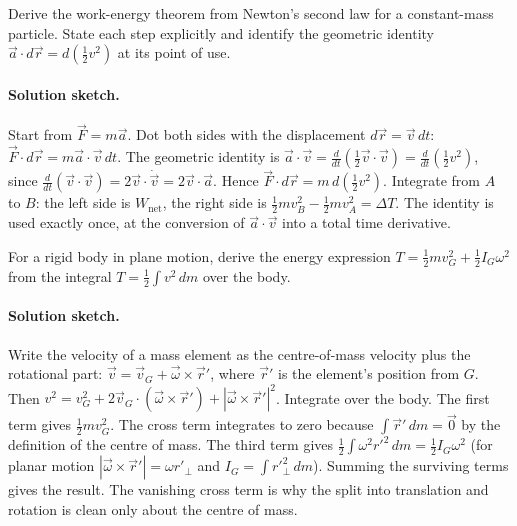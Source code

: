 \begin{exercise}
Derive the work-energy theorem from Newton's second law for a
constant-mass particle. State each step explicitly and identify the
geometric identity $\vec{a}\cdot d\vec{r} = d(\tfrac{1}{2} v^2)$ at
its point of use.
\paragraph{Solution sketch.} Start from $\vec{F}=m\vec{a}$. Dot both
sides with the displacement $d\vec{r}=\vec{v}\,dt$:
$\vec{F}\cdot d\vec{r}=m\vec{a}\cdot\vec{v}\,dt$. The geometric
identity is $\vec{a}\cdot\vec{v}=\tfrac{d}{dt}(\tfrac{1}{2}\vec{v}\cdot
\vec{v})=\tfrac{d}{dt}(\tfrac{1}{2}v^{2})$, since $\tfrac{d}{dt}(\vec{v}
\cdot\vec{v})=2\vec{v}\cdot\dot{\vec{v}}=2\vec{v}\cdot\vec{a}$. Hence
$\vec{F}\cdot d\vec{r}=m\,d(\tfrac{1}{2}v^{2})$. Integrate from $A$ to
$B$: the left side is $W_{\text{net}}$, the right side is $\tfrac{1}{2}
mv_{B}^{2}-\tfrac{1}{2}mv_{A}^{2}=\Delta T$. The identity is used
exactly once, at the conversion of $\vec{a}\cdot\vec{v}$ into a total
time derivative.
\end{exercise}

\begin{exercise}
For a rigid body in plane motion, derive the energy expression $T =
\tfrac{1}{2} m v_G^2 + \tfrac{1}{2} I_G \omega^2$ from the integral
$T = \tfrac{1}{2}\int v^2 \,dm$ over the body.
\paragraph{Solution sketch.} Write the velocity of a mass element as
the centre-of-mass velocity plus the rotational part:
$\vec{v}=\vec{v}_{G}+\vec{\omega}\times\vec{r}'$, where $\vec{r}'$ is
the element's position from $G$. Then $v^{2}=v_{G}^{2}+2\vec{v}_{G}
\cdot(\vec{\omega}\times\vec{r}')+|\vec{\omega}\times\vec{r}'|^{2}$.
Integrate over the body. The first term gives $\tfrac{1}{2}mv_{G}^{2}$.
The cross term integrates to zero because $\int\vec{r}'\,dm=\vec{0}$ by
the definition of the centre of mass. The third term gives $\tfrac{1}{2}
\int\omega^{2}r'^{2}\,dm=\tfrac{1}{2}I_{G}\omega^{2}$ (for planar
motion $|\vec{\omega}\times\vec{r}'|=\omega r'_{\perp}$ and $I_{G}=
\int r'^{2}_{\perp}\,dm$). Summing the surviving terms gives the
result. The vanishing cross term is why the split into translation and
rotation is clean only about the centre of mass.
\end{exercise}

